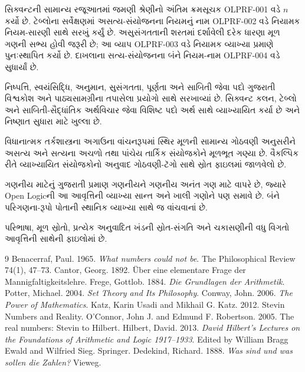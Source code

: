 સિક્વન્ટની સામાન્ય રજૂઆતમાં જમણી શ્રેણીનો અંતિમ ક્રમસૂચક OLPRF-001
વડે $n$ કર્યો છે. ટેબ્લોના સર્વેક્ષણમાં અસત્ય-સંયોજનના નિયમનું નામ
OLPRF-002 વડે નિયામક નિયમ-સારણી સાથે સરખું કર્યું છે. અસુસંગતતાની
શરતમાં દર્શાવેલી દરેક ધારણા મૂળ ગણની સભ્ય હોવી જરૂરી છે; આ વ્યાપ
OLPRF-003 વડે નિયામક વ્યાખ્યા પ્રમાણે પુનઃસ્થાપિત કર્યો છે. દાખલાના
સત્ય-સંયોજનના બંને નિયમ-નામ OLPRF-004 વડે સુધાર્યાં છે.

નિષ્પત્તિ, સ્વયંસિદ્ધિ, અનુમાન, સુસંગતતા, પૂર્ણતા અને સાબિતી જેવા
પદો ગુજરાતી વિશ્વકોશ અને પાઠ્યસામગ્રીના તપાસેલા પ્રયોગો સાથે
સરખાવ્યાં છે. સિક્વન્ટ કલન, ટેબ્લો અને સાબિતી-સૈદ્ધાંતિક અર્થવિચાર
જેવા વિશિષ્ટ પદો અર્થ સાથે વ્યાખ્યાયિત કર્યા છે અને નિષ્ણાત સુધારા
માટે ખુલ્લા છે.

વિધાનાત્મક તર્કશાસ્ત્રના અગાઉના વાંચનરૂપમાં સ્થિર મૂળની સામાન્ય
ગોઠવણી અનુસરીને અસત્ય અને સત્યના અચળો તથા પાંચેય તાર્કિક સંયોજકોને
મૂળભૂત ગણ્યા છે. વૈકલ્પિક રીતે વ્યાખ્યાયિત સંયોજકોનો અનુવાદ
ગોઠવણી-ટૅગો સાથે સ્રોત ફાઇલમાં જાળવેલો છે.

ગણનીય માટેનું ગુજરાતી પ્રમાણ ગણનીયને ગણનીય અનંત ગણ માટે વાપરે છે,
જ્યારે Open Logicની આ આવૃત્તિની વ્યાખ્યા સાન્ત અને ખાલી ગણોને પણ
સમાવે છે. બંને પરિગણના-રૂપો પોતાની સ્થાનિક વ્યાખ્યા સાથે જ વાંચવાનાં છે.

પરિભાષા, મૂળ સ્રોતો, પ્રત્યેક અનુવાદિત ખંડની સ્રોત-સંગતિ અને
ચકાસણીની વધુ વિગતો આવૃત્તિની સાથેની ફાઇલોમાં છે.
\begin{thebibliography}{9}
Benacerraf, Paul. 1965. \emph{What numbers could not be}.
The Philosophical Review 74(1), 47--73.
Cantor, Georg. 1892. Über eine elementare Frage der Mannigfaltigkeitslehre.
Frege, Gottlob. 1884. \emph{Die Grundlagen der Arithmetik}.
Potter, Michael. 2004. \emph{Set Theory and Its Philosophy}.
Conway, John. 2006. \emph{The Power of Mathematics}.
Katz, Karin Usadi and Mikhail G. Katz. 2012. Stevin Numbers and Reality.
O'Connor, John J. and Edmund F. Robertson. 2005. The real numbers: Stevin to Hilbert.
Hilbert, David. 2013. \emph{David Hilbert's Lectures on the Foundations of Arithmetic and Logic 1917--1933}.
Edited by William Bragg Ewald and Wilfried Sieg. Springer.
Dedekind, Richard. 1888. \emph{Was sind und was sollen die Zahlen?} Vieweg.
\end{thebibliography}

